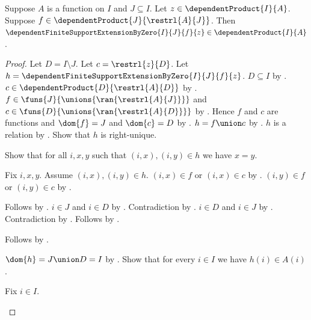 \begin{proposition}\label{dependent_finite_support_extension_by_zero_type}
    Suppose $A$ is a function on $I$ and $J\subseteq I$.
    Let $z\in\dependentProduct{I}{A}$.
    Suppose $f\in\dependentProduct{J}{\restrl{A}{J}}$.
    Then
        $\dependentFiniteSupportExtensionByZero{I}{J}{f}{z}
            \in\dependentProduct{I}{A}$.
\end{proposition}
\begin{proof}
    Let $D=I\setminus J$.
    Let $c=\restrl{z}{D}$.
    Let $h=\dependentFiniteSupportExtensionByZero{I}{J}{f}{z}$.
    $D\subseteq I$ by .
    $c\in\dependentProduct{D}{\restrl{A}{D}}$ by
        .
    $f\in\funs{J}{\unions{\ran{\restrl{A}{J}}}}$ and
        $c\in\funs{D}{\unions{\ran{\restrl{A}{D}}}}$ by
        .
    Hence $f$ and $c$ are functions and $\dom{f}=J$ and $\dom{c}=D$ by
        .
    $h=f\union c$ by
        .
    $h$ is a relation by .
    Show that $h$ is right-unique.
    \begin{subproof}
        Show that for all $i,x,y$ such that $(i,x),(i,y)\in h$ we have
            $x=y$.
        \begin{subproof}
            Fix $i,x,y$.
            Assume $(i,x),(i,y)\in h$.
            $(i,x)\in f$ or $(i,x)\in c$ by .
            $(i,y)\in f$ or $(i,y)\in c$ by .
            \begin{byCase}
                Follows by .
                $i\in J$ and $i\in D$ by .
                Contradiction by .
                $i\in D$ and $i\in J$ by .
                Contradiction by .
                Follows by .
            \end{byCase}
        \end{subproof}
        Follows by .
    \end{subproof}
    $\dom{h}=J\union D=I$ by
        .
    Show that for every $i\in I$ we have $h(i)\in A(i)$.
    \begin{subproof}
        Fix $i\in I$.
        \begin{byCase}

\end{byCase}
\end{subproof}
\end{proof}
